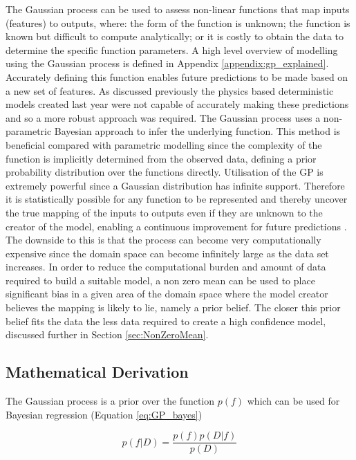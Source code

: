 \documentclass[a4paper, 10pt]{article}
\numberwithin{equation}{section}
\begin{document}
The Gaussian process can be used to assess non-linear functions that map inputs (features) to outputs, where: the form of the function is unknown; the function is known but difficult to compute analytically; or it is costly to obtain the data to determine the specific function parameters. A high level overview of modelling using the Gaussian process is defined in Appendix \ref{appendix:gp_explained}. Accurately defining this function enables future predictions to be made based on a new set of features. As discussed previously the physics based deterministic models created last year were not capable of accurately making these predictions and so a more robust approach was required. The Gaussian process uses a non-parametric Bayesian approach to infer the underlying function. This method is beneficial compared with parametric modelling since the complexity of the function is implicitly determined from the observed data, defining a prior probability distribution over the functions directly. Utilisation of the GP is extremely powerful since a Gaussian distribution has infinite support. Therefore it is statistically possible for any function to be represented and thereby uncover the true mapping of the inputs to outputs even if they are unknown to the creator of the model, enabling a continuous improvement for future predictions \cite{Williams97predictionwith}. The downside to this is that the process can become very computationally expensive since the domain space can become infinitely large as the data set increases. In order to reduce the computational burden and amount of data required to build a suitable model, a non zero mean can be used to place significant bias in a given area of the domain space where the model creator believes the mapping is likely to lie, namely a prior belief. The closer this prior belief fits the data the less data required to create a high confidence model, discussed further in Section \ref{sec:NonZeroMean}.


\subsection{Mathematical Derivation}

The Gaussian process is a prior over the function $p(f)$ which can be used for Bayesian regression (Equation \ref{eq:GP_bayes})

\begin{equation}
    \label{eq:GP_bayes}
    p(f|D) = \frac{p(f)p(D|f)}{p(D)}
\end{equation}
\end{document}
